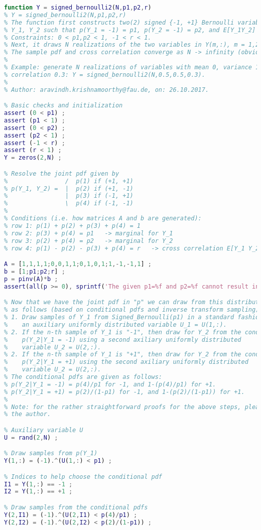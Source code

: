 \begin{lstlisting}[language=MATLAB,numbers=none]
function Y = signed_bernoulli2(N,p1,p2,r)
% Y = signed_bernoulli2(N,p1,p2,r) 
% The function first constructs two(2) signed {-1, +1} Bernoulli variables
% Y_1, Y_2 such that p(Y_1 = -1) = p1, p(Y_2 = -1) = p2, and E[Y_1Y_2] = r.
% Constraints: 0 < p1,p2 < 1, -1 < r < 1.
% Next, it draws N realizations of the two variables in Y(m,:), m = 1,2.
% The sample pdf and cross correlation converge as N -> infinity (obviously).
%
% Example: generate N realizations of variables with mean 0, variance 1, and
% correlation 0.3: Y = signed_bernoulli2(N,0.5,0.5,0.3).
%
% Author: aravindh.krishnamoorthy@fau.de, on: 26.10.2017.

% Basic checks and initialization
assert (0 < p1) ;
assert (p1 < 1) ;
assert (0 < p2) ;
assert (p2 < 1) ;
assert (-1 < r) ;
assert (r < 1) ;
Y = zeros(2,N) ;

% Resolve the joint pdf given by
%                /  p(1) if (+1, +1)
% p(Y_1, Y_2) =  |  p(2) if (+1, -1)
%                |  p(3) if (-1, +1)
%                \  p(4) if (-1, -1)
%
% Conditions (i.e. how matrices A and b are generated):
% row 1: p(1) + p(2) + p(3) + p(4) = 1
% row 2: p(3) + p(4) = p1   -> marginal for Y_1
% row 3: p(2) + p(4) = p2   -> marginal for Y_2
% row 4: p(1) - p(2) - p(3) + p(4) = r   -> cross correlation E[Y_1 Y_2]

A = [1,1,1,1;0,0,1,1;0,1,0,1;1,-1,-1,1] ;
b = [1;p1;p2;r] ;
p = pinv(A)*b ;
assert(all(p >= 0), sprintf('The given p1=%f and p2=%f cannot result in a correlation r=%f with the given algorithm.\np1=p2=0.5 is a safe value.',p1,p2,r)) ;

% Now that we have the joint pdf in "p" we can draw from this distribution
% as follows (based on conditional pdfs and inverse transform sampling):
% 1. Draw samples of Y_1 from Signed_Bernoulli(p1) in a standard fashion using
%    an auxiliary uniformly distributed variable U_1 = U(1,:).
% 2. If the n-th sample of Y_1 is "-1", then draw for Y_2 from the conditional pdf
%    p(Y_2|Y_1 = -1) using a second axiliary uniformly distributed
%    variable U_2 = U(2,:).
% 2. If the n-th sample of Y_1 is "+1", then draw for Y_2 from the conditional pdf
%    p(Y_2|Y_1 = +1) using the second axiliary uniformly distributed
%    variable U_2 = U(2,:).
% The conditional pdfs are given as follows:
% p(Y_2|Y_1 = -1) = p(4)/p1 for -1, and 1-(p(4)/p1) for +1.
% p(Y_2|Y_1 = +1) = p(2)/(1-p1) for -1, and 1-(p(2)/(1-p1)) for +1.
%
% Note: for the rather straightforward proofs for the above steps, please contact
% the author.

% Auxiliary variable U
U = rand(2,N) ;

% Draw samples from p(Y_1)
Y(1,:) = (-1).^(U(1,:) < p1) ;

% Indices to help choose the conditional pdf
I1 = Y(1,:) == -1 ;
I2 = Y(1,:) == +1 ;

% Draw samples from the conditional pdfs
Y(2,I1) = (-1).^(U(2,I1) < p(4)/p1) ;
Y(2,I2) = (-1).^(U(2,I2) < p(2)/(1-p1)) ;
\end{lstlisting}

